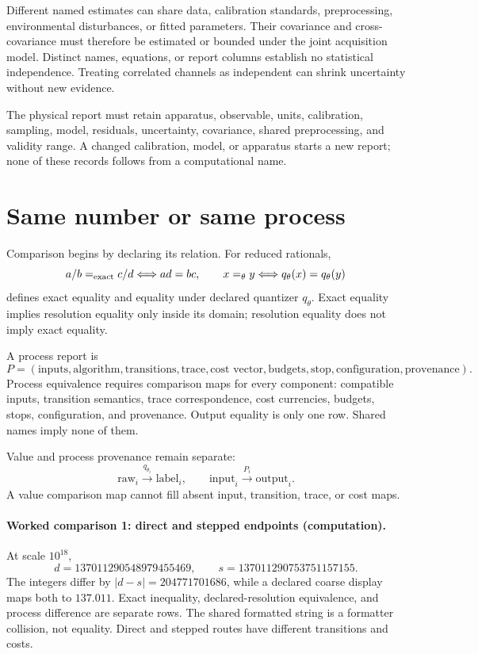 Different named estimates can share data, calibration standards, preprocessing, environmental disturbances, or fitted
parameters.  Their covariance and cross-covariance must therefore be estimated or bounded under the joint acquisition
model.  Distinct names, equations, or report columns establish no statistical independence.  Treating correlated
channels as independent can shrink uncertainty without new evidence.

The physical report must retain apparatus, observable, units, calibration, sampling, model, residuals, uncertainty,
covariance, shared preprocessing, and validity range.  A changed calibration, model, or apparatus starts a new report;
none of these records follows from a computational name.

\section{Same number or same process}

Comparison begins by declaring its relation.  For reduced rationals,
\[
a/b =_{\rm exact} c/d\Longleftrightarrow ad=bc,
\qquad
x =_\theta y\Longleftrightarrow q_\theta(x)=q_\theta(y)
\]
defines exact equality and equality under declared quantizer \(q_\theta\).  Exact equality implies resolution equality
only inside its domain; resolution equality does not imply exact equality.

A process report is
\[
P=(\text{inputs},\text{algorithm},\text{transitions},\text{trace},\text{cost vector},
\text{budgets},\text{stop},\text{configuration},\text{provenance}).
\]
Process equivalence requires comparison maps for every component: compatible inputs, transition semantics, trace
correspondence, cost currencies, budgets, stops, configuration, and provenance.  Output equality is only one row.
Shared names imply none of them.

Value and process provenance remain separate:
\[
\text{raw}_i\xrightarrow{q_{\theta_i}}\text{label}_i,
\qquad
\text{input}_i\xrightarrow{P_i}\text{output}_i.
\]
A value comparison map cannot fill absent input, transition, trace, or cost maps.

\paragraph{Worked comparison 1: direct and stepped endpoints (computation).}
At scale \(10^{18}\),
\[
d=137011290548979455469,\qquad s=137011290753751157155.
\]
The integers differ by \(|d-s|=204771701686\), while a declared coarse display maps both to \(137.011\).  Exact
inequality, declared-resolution equivalence, and process difference are separate rows.  The shared formatted string is
a formatter collision, not equality.  Direct and stepped routes have different transitions and costs.

